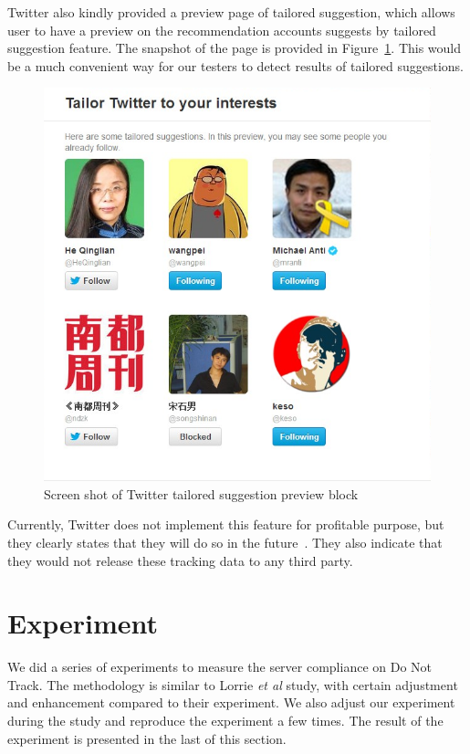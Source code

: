 \documentclass{sig-alternate}
\begin{document}
Twitter also kindly provided a preview page of tailored suggestion, which allows user to have a preview on the recommendation accounts suggests by tailored suggestion feature. The snapshot of the page is provided in Figure~\ref{fig:tailored}. This would be a much convenient way for our testers to detect results of tailored suggestions.

\begin{figure}
\begin{center}
\includegraphics[width=0.9\columnwidth]{tailored}
\end{center}
\caption{Screen shot of Twitter tailored suggestion preview block}
\label{fig:tailored}
\end{figure}


Currently, Twitter does not implement this feature for profitable purpose, but they clearly states that they will do so in the future~\cite{twitterfaq}. They also indicate that they would not release these tracking data to any third party.

\section{Experiment} \label{sec:experiment}

We did a series of experiments to measure the server compliance on Do Not Track. The methodology is similar to Lorrie \emph{et al} study, with certain adjustment and enhancement compared to their experiment. We also adjust our experiment during the study and reproduce the experiment a few times. The result of the experiment is presented in the last of this section.
\end{document}
